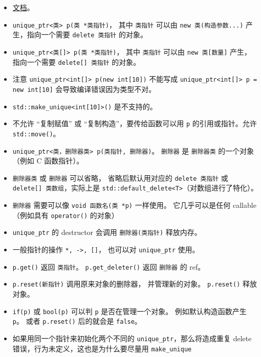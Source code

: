 \begin{itemize}
\item \href{https://en.cppreference.com/w/cpp/memory/unique_ptr}{文档}。
\item \verb`unique_ptr<类> p(类 *类指针)`， 其中 \verb`类指针` 可以由 \verb`new 类(构造参数...)` 产生，指向一个需要 \verb`delete 类指针` 的对象。
\item \verb`unique_ptr<类[]> p(类 *类指针)`， 其中 \verb`类指针` 可以由 \verb`new 类[数量]` 产生，指向一个需要 \verb`delete[] 类指针` 的对象。
\item 注意 \verb`unique_ptr<int[]> p(new int[10])` 不能写成 \verb`unique_ptr<int[]> p = new int[10]` 会导致编译错误因为类型不对。
\item \verb`std::make_unique<int[10]>()` 是不支持的。
\item 不允许 “复制赋值” 或 “复制构造”，要传给函数可以用 \verb`p` 的引用或指针。允许 \verb`std::move()`。
\item \verb`unique_ptr<类，删除器类> p(类指针, 删除器)`。 \verb`删除器` 是 \verb`删除器类` 的一个对象（例如 C 函数指针）。
\item \verb`删除器类` 或 \verb`删除器` 可以省略， 省略后默认用对应的 \verb`delete 类指针` 或 \verb`delete[] 类数组`，实际上是 \verb`std::default_delete<T>`（对数组进行了特化）。
\item \verb`删除器` 需要可以像 \verb`void 函数名(类 *p)` 一样使用。 它几乎可以是任何 callable（例如具有 \verb`operator()` 的对象）
\item \verb`unique_ptr` 的 destructor 会调用 \verb`删除器(类指针)` 释放内存。
\item 一般指针的操作 \verb`*, ->, []`， 也可以对 \verb`unique_ptr` 使用。
\item \verb`p.get()` 返回 \verb`类指针`。 \verb`p.get_deleter()` 返回 \verb`删除器` 的 ref。
\item \verb`p.reset(新指针)` 调用原来对象的删除器， 并管理新的对象。 \verb`p.reset()` 释放对象。
\item \verb`if(p)` 或 \verb`bool(p)` 可以判 \verb`p` 是否在管理一个对象。 例如默认构造函数产生 \verb`p`。 或者 \verb`p.reset()` 后的就会是 \verb`false`。
\item 如果用同一个指针来初始化两个不同的 \verb`unique_ptr`，那么将造成重复 delete 错误，行为未定义，这也是为什么要尽量用 \verb`make_unique`
\end{itemize}


